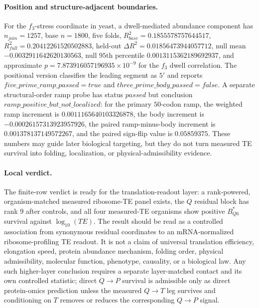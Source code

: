\paragraph{Position and structure-adjacent boundaries.}
For the $f_3$-stress coordinate in yeast, a dwell-mediated abundance component has $n_{join}=1257$, base $n=1800$, five folds, $R^2_{base}=0.1855578757644517$, $R^2_{full}=0.20412261520502883$, held-out $\Delta R^2=0.01856473944057712$, null mean $-0.0032911642620130563$, null $95$th percentile $0.0013115362189692937$, and approximate $p=7.873916057196935\times 10^{-9}$ for the $f_3$ dwell correlation.  The positional version classifies the leading segment as $5'$ and reports $five\_prime\_ramp\_passed=true$ and $three\_prime\_body\_passed=false$.  A separate structural-order ramp probe has status $passed$ but conclusion $ramp\_positive\_but\_not\_localized$: for the primary $50$-codon ramp, the weighted ramp increment is $0.0011165640103326878$, the body increment is $-0.00026157313923957926$, the paired ramp-minus-body increment is $0.001378137149572267$, and the paired sign-flip value is $0.05859375$.  These numbers may guide later biological targeting, but they do not turn measured TE survival into folding, localization, or physical-admissibility evidence.

\paragraph{Local verdict.}
The finite-row verdict is ready for the translation-readout layer: a rank-powered, organism-matched measured ribosome-TE panel exists, the $Q$ residual block has rank $9$ after controls, and all four measured-TE organisms show positive $B^{\ast}_{Q6}$ survival against $\log_{10}(TE)$.  The result should be read as a controlled association from synonymous residual coordinates to an mRNA-normalized ribosome-profiling TE readout.  It is not a claim of universal translation efficiency, elongation speed, protein abundance mechanism, folding order, physical admissibility, molecular function, phenotype, causality, or a biological law.  Any such higher-layer conclusion requires a separate layer-matched contact and its own controlled statistic; direct $Q\to P$ survival is admissible only as direct protein-omics prediction unless the measured $Q\to T$ leg survives and conditioning on $T$ removes or reduces the corresponding $Q\to P$ signal.